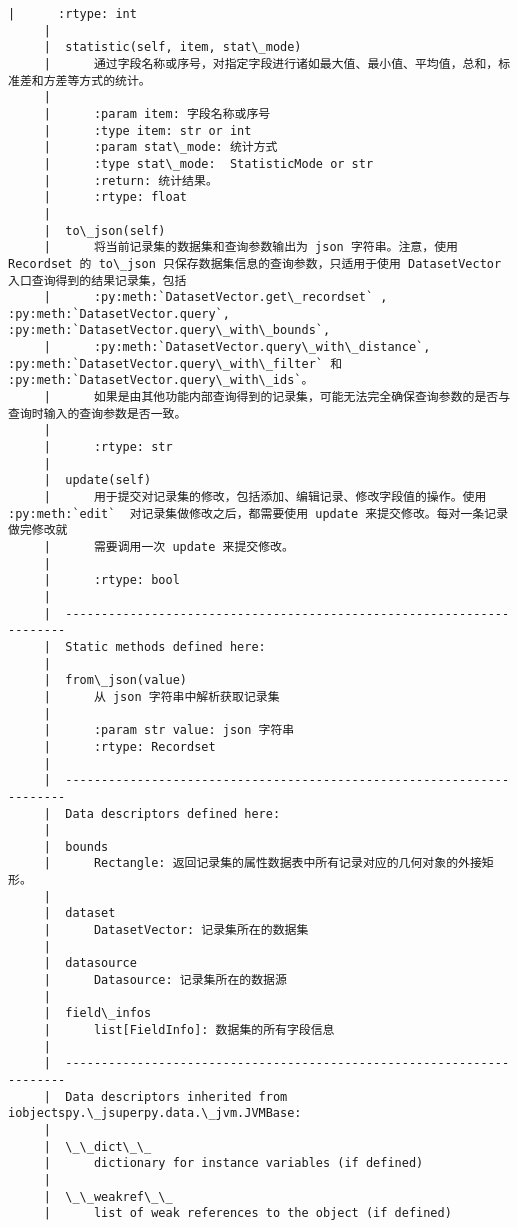 \documentclass[11pt]{article}
\begin{document}
\begin{Verbatim}[commandchars=\\\{\}]
     |      :rtype: int
     |  
     |  statistic(self, item, stat\_mode)
     |      通过字段名称或序号，对指定字段进行诸如最大值、最小值、平均值，总和，标准差和方差等方式的统计。
     |      
     |      :param item: 字段名称或序号
     |      :type item: str or int
     |      :param stat\_mode: 统计方式
     |      :type stat\_mode:  StatisticMode or str
     |      :return: 统计结果。
     |      :rtype: float
     |  
     |  to\_json(self)
     |      将当前记录集的数据集和查询参数输出为 json 字符串。注意，使用 Recordset 的 to\_json 只保存数据集信息的查询参数，只适用于使用 DatasetVector 入口查询得到的结果记录集，包括
     |      :py:meth:`DatasetVector.get\_recordset` , :py:meth:`DatasetVector.query`, :py:meth:`DatasetVector.query\_with\_bounds`,
     |      :py:meth:`DatasetVector.query\_with\_distance`, :py:meth:`DatasetVector.query\_with\_filter` 和 :py:meth:`DatasetVector.query\_with\_ids`。
     |      如果是由其他功能内部查询得到的记录集，可能无法完全确保查询参数的是否与查询时输入的查询参数是否一致。
     |      
     |      :rtype: str
     |  
     |  update(self)
     |      用于提交对记录集的修改，包括添加、编辑记录、修改字段值的操作。使用 :py:meth:`edit`  对记录集做修改之后，都需要使用 update 来提交修改。每对一条记录做完修改就
     |      需要调用一次 update 来提交修改。
     |      
     |      :rtype: bool
     |  
     |  ----------------------------------------------------------------------
     |  Static methods defined here:
     |  
     |  from\_json(value)
     |      从 json 字符串中解析获取记录集
     |      
     |      :param str value: json 字符串
     |      :rtype: Recordset
     |  
     |  ----------------------------------------------------------------------
     |  Data descriptors defined here:
     |  
     |  bounds
     |      Rectangle: 返回记录集的属性数据表中所有记录对应的几何对象的外接矩形。
     |  
     |  dataset
     |      DatasetVector: 记录集所在的数据集
     |  
     |  datasource
     |      Datasource: 记录集所在的数据源
     |  
     |  field\_infos
     |      list[FieldInfo]: 数据集的所有字段信息
     |  
     |  ----------------------------------------------------------------------
     |  Data descriptors inherited from iobjectspy.\_jsuperpy.data.\_jvm.JVMBase:
     |  
     |  \_\_dict\_\_
     |      dictionary for instance variables (if defined)
     |  
     |  \_\_weakref\_\_
     |      list of weak references to the object (if defined)
    

\end{Verbatim}
\end{document}
